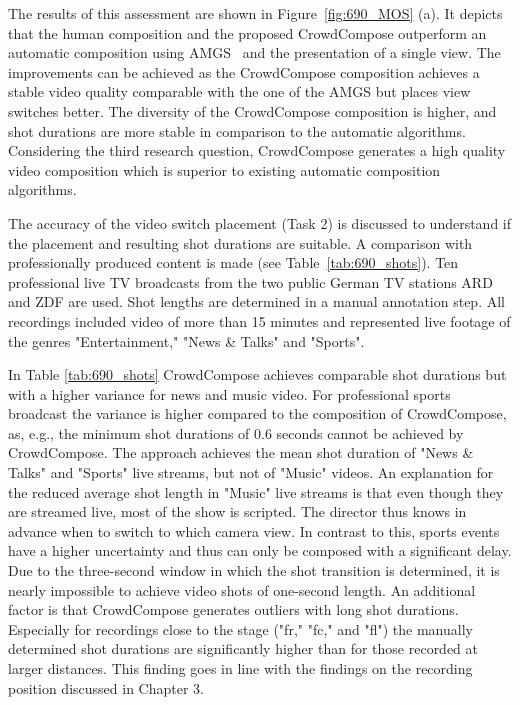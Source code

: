 The results of this assessment are shown in Figure~\ref{fig:690_MOS} (a).
It depicts that the human composition and the proposed CrowdCompose outperform an automatic composition using \ac{AMGS}~\cite{Shrestha2010} and the presentation of a single view.
The improvements can be achieved as the CrowdCompose composition achieves a stable video quality comparable with the one of the \ac{AMGS} but places view switches better.
The diversity of the CrowdCompose composition is higher, and shot durations are more stable in comparison to the automatic algorithms. 
Considering the third research question, CrowdCompose generates a high quality video composition which is superior to existing automatic composition algorithms.

The accuracy of the video switch placement (Task 2) is discussed to understand if the placement and resulting shot durations are suitable.
A comparison with professionally produced content is made (see Table~\ref{tab:690_shots}). 
Ten professional live TV broadcasts from the two public German TV stations ARD and ZDF are used.
Shot lengths are determined in a manual annotation step. 
All recordings included video of more than 15 minutes and represented live footage of the genres "Entertainment," "News \& Talks" and "Sports".

In Table \ref{tab:690_shots} CrowdCompose achieves comparable shot durations but with a higher variance for news and music video. 
For professional sports broadcast the variance is higher compared to the composition of CrowdCompose, as, e.g., the minimum shot durations of 0.6 seconds cannot be achieved by CrowdCompose. 
The approach achieves the mean shot duration of "News \& Talks" and "Sports" live streams, but not of "Music" videos.
An explanation for the reduced average shot length in "Music" live streams is that even though they are streamed live, most of the show is scripted. 
The director thus knows in advance when to switch to which camera view.
In contrast to this, sports events have a higher uncertainty and thus can only be composed with a significant delay. 
Due to the three-second window in which the shot transition is determined, it is nearly impossible to achieve video shots of one-second length. 
An additional factor is that CrowdCompose generates outliers with long shot durations.
Especially for recordings close to the stage ("fr," "fc," and "fl") the manually determined shot durations are significantly higher than for those recorded at larger distances.
This finding goes in line with the findings on the recording position discussed in Chapter 3.

